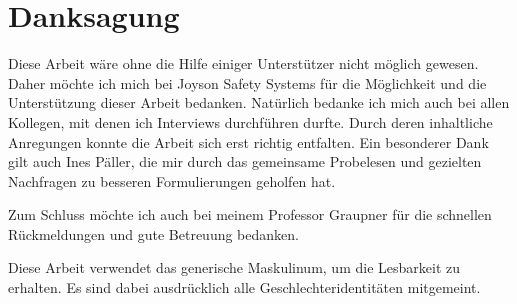 \section*{Danksagung}
Diese Arbeit wäre ohne die Hilfe einiger Unterstützer nicht möglich gewesen.
Daher möchte ich mich bei Joyson Safety Systems für die Möglichkeit und die 
Unterstützung dieser Arbeit bedanken. Natürlich bedanke ich mich auch bei allen
Kollegen, mit denen ich Interviews durchführen durfte. Durch deren inhaltliche 
Anregungen konnte die Arbeit sich erst richtig entfalten. Ein besonderer Dank gilt
auch Ines Päller, die mir durch das gemeinsame Probelesen und gezielten Nachfragen 
zu besseren Formulierungen geholfen hat.

Zum Schluss möchte ich auch bei meinem Professor Graupner für die schnellen 
Rückmeldungen und gute Betreuung bedanken.

\newpage

Diese Arbeit verwendet das generische Maskulinum, um die Lesbarkeit zu erhalten.
Es sind dabei ausdrücklich alle Geschlechteridentitäten mitgemeint.

\newpage
{}